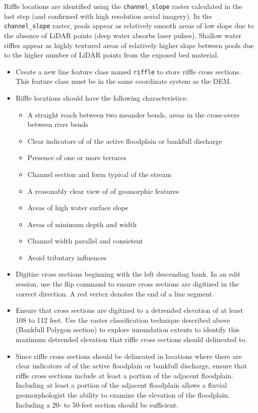 \documentclass[]{book}
\providecommand{\tightlist}{%
  \setlength{\itemsep}{0pt}\setlength{\parskip}{0pt}}
\theoremstyle{definition}
\theoremstyle{definition}
\theoremstyle{definition}
\theoremstyle{remark}
\begin{document}
Riffle locations are identified using the \texttt{channel\_slope} raster
calculated in the last step (and confirmed with high resolution aerial
imagery). In the \texttt{channel\_slope} raster, pools appear as
relatively smooth areas of low slope due to the absence of LiDAR points
(deep water absorbs laser pulses). Shallow water riffles appear as
highly textured areas of relatively higher slope between pools due to
the higher number of LiDAR points from the exposed bed material.

\begin{itemize}
\item
  Create a new line feature class named \texttt{riffle} to store riffle
  cross sections. This feature class must be in the same coordinate
  system as the DEM.
\item
  Riffle locations should have the following characteristics:

  \begin{itemize}
  \tightlist
  \item
    A straight reach between two meander bends, areas in the cross-overs
    between river bends
  \item
    Clear indicators of of the active floodplain or bankfull discharge
  \item
    Presence of one or more terraces
  \item
    Channel section and form typical of the stream
  \item
    A reasonably clear view of of geomorphic features
  \item
    Areas of high water surface slope
  \item
    Areas of minimum depth and width
  \item
    Channel width parallel and consistent
  \item
    Avoid tributary influences
  \end{itemize}
\item
  Digitize cross sections beginning with the left descending bank. In an
  edit session, use the flip command to ensure cross sections are
  digitized in the correct direction. A red vertex denotes the end of a
  line segment.
\item
  Ensure that cross sections are digitized to a detrended elevation of
  at least 108 to 112 feet. Use the raster classification technique
  described above (Bankfull Polygon section) to explore innundation
  extents to identify this maximum detrended elevation that riffle cross
  sections should delineated to.
\item
  Since riffle cross sections should be delineated in locations where
  there are clear indicators of of the active floodplain or bankfull
  discharge, ensure that riffle cross sections include at least a
  portion of the adjacent floodplain. Including at least a portion of
  the adjacent floodplain allows a fluvial geomorphologist the ability
  to examine the elevation of the floodplain. Including a 20- to 50-feet
  section should be sufficient.
\end{itemize}
\end{document}
